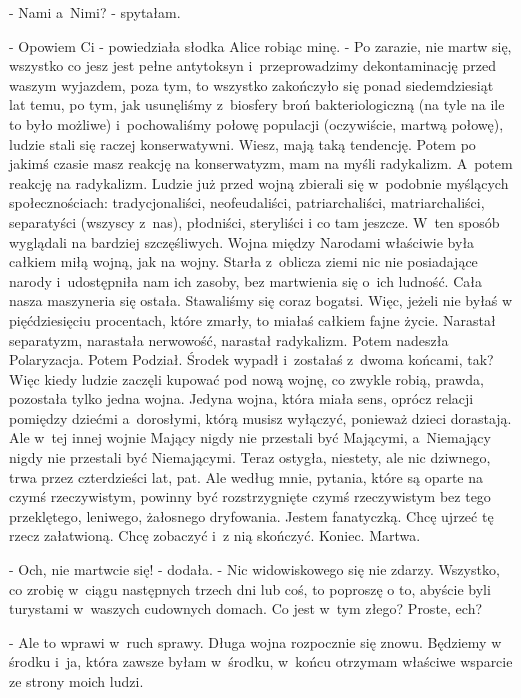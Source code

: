 \documentclass[oneside,polish,12pt,sfheadings]{mwbk}
\begin{document}
- Nami a~Nimi? - spytałam.

- Opowiem Ci - powiedziała słodka Alice robiąc minę. - Po zarazie,
nie martw się, wszystko co jesz jest pełne antytoksyn i~przeprowadzimy
dekontaminację przed waszym wyjazdem, poza tym, to wszystko zakończyło
się ponad siedemdziesiąt lat temu, po tym, jak usunęliśmy z~biosfery
broń bakteriologiczną (na tyle na ile to było możliwe) i~pochowaliśmy
połowę populacji (oczywiście, martwą połowę), ludzie stali się raczej
konserwatywni. Wiesz, mają taką tendencję. Potem po jakimś czasie
masz reakcję na konserwatyzm, mam na myśli radykalizm. A~potem reakcję
na radykalizm. Ludzie już przed wojną zbierali się w~podobnie myślących
społecznościach: tradycjonaliści, neofeudaliści, patriarchaliści,
matriarchaliści, separatyści (wszyscy z~nas), płodniści, steryliści
i co tam jeszcze. W~ten sposób wyglądali na bardziej szczęśliwych.
Wojna między Narodami właściwie była całkiem miłą wojną, jak na wojny.
Starła z~oblicza ziemi nic nie posiadające narody i~udostępniła nam
ich zasoby, bez martwienia się o~ich ludność. Cała nasza maszyneria
się ostała. Stawaliśmy się coraz bogatsi. Więc, jeżeli nie byłaś w
pięćdziesięciu procentach, które zmarły, to miałaś całkiem fajne życie.
Narastał separatyzm, narastała nerwowość, narastał radykalizm. Potem
nadeszła Polaryzacja. Potem Podział. Środek wypadł i~zostałaś z~dwoma
końcami, tak? Więc kiedy ludzie zaczęli kupować pod nową wojnę, co
zwykle robią, prawda, pozostała tylko jedna wojna. Jedyna wojna, która
miała sens, oprócz relacji pomiędzy dziećmi a~dorosłymi, którą musisz
wyłączyć, ponieważ dzieci dorastają. Ale w~tej innej wojnie Mający
nigdy nie przestali być Mającymi, a~Niemający nigdy nie przestali
być Niemającymi. Teraz ostygła, niestety, ale nic dziwnego, trwa przez
czterdzieści lat, pat. Ale według mnie, pytania, które są oparte na
czymś rzeczywistym, powinny być rozstrzygnięte czymś rzeczywistym
bez tego przeklętego, leniwego, żałosnego dryfowania. Jestem fanatyczką.
Chcę ujrzeć tę rzecz załatwioną. Chcę zobaczyć i~z nią skończyć. Koniec.
Martwa.

- Och, nie martwcie się! - dodała. - Nic widowiskowego się nie zdarzy.
Wszystko, co zrobię w~ciągu następnych trzech dni lub coś, to poproszę
o to, abyście byli turystami w~waszych cudownych domach. Co jest w~tym złego? Proste, ech?

- Ale to wprawi w~ruch sprawy. Długa wojna rozpocznie się znowu. Będziemy
w środku i~ja, która zawsze byłam w~środku, w~końcu otrzymam właściwe
wsparcie ze strony moich ludzi.
\end{document}
